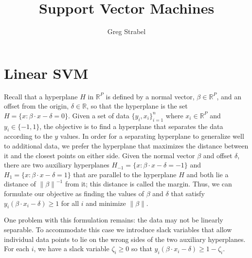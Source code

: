 \documentclass[11pt]{article}
\author{Greg Strabel}
\title{Support Vector Machines}
\begin{document}
\maketitle
\section{Linear SVM}
Recall that a hyperplane $H$ in $\mathbb{R}^P$ is defined by a normal vector, $\beta \in \mathbb{R}^P$, and an offset from the origin, $\delta \in \mathbb{R}$, so that the hyperplane is the set $H = \{ x : \beta \cdot x - \delta = 0 \}$. Given a set of data $\{y_i,x_i \}_{i=1}^n$ where $x_i \in \mathbb{R}^P$ and $y_i \in \{-1,1\}$, the objective is to find a hyperplane that separates the data according to the $y$ values. In order for a separating hyperplane to generalize well to additional data, we prefer the hyperplane that maximizes the distance between it and the closest points on either side. Given the normal vector $\beta$ and offset $\delta$, there are two auxiliary hyperplanes $H_{-1} = \{ x : \beta \cdot x - \delta = -1 \}$ and $H_1 = \{ x : \beta \cdot x - \delta = 1 \}$ that are parallel to the hyperplane $H$ and both lie a distance of ${\| \beta \|}^{-1}$ from it; this distance is called the margin. Thus, we can formulate our objective as finding the values of $\beta$ and $\delta$ that satisfy $y_i \left( \beta \cdot x_i - \delta \right) \geq 1$ for all $i$ and minimize $\| \beta \|$.

One problem with this formulation remains: the data may not be linearly separable. To accommodate this case we introduce slack variables that allow individual data points to lie on the wrong sides of the two auxiliary hyperplanes. For each $i$, we have a slack variable $\zeta_i \geq 0$ so that $y_i \left( \beta \cdot x_i - \delta \right) \geq 1 - \zeta_i$.
\end{document}

